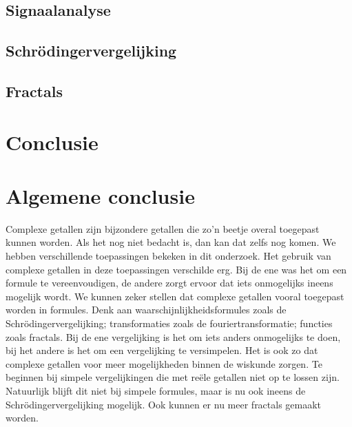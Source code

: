 \documentclass[11pt,fleqn]{book} %
\begin{document}
\subsection*{Signaalanalyse}
\printbibliography[heading=bibempty,keyword=sign]

\subsection*{Schrödingervergelijking}
\printbibliography[heading=bibempty,keyword=schr]

\subsection*{Fractals}
\printbibliography[heading=bibempty,keyword=frac]

\section*{Conclusie}
\printbibliography[heading=bibempty,keyword=conc]

\section*{Algemene conclusie}
Complexe getallen zijn bijzondere getallen die zo'n beetje overal toegepast kunnen worden. Als het nog niet bedacht is, dan kan dat zelfs nog komen. We hebben verschillende toepassingen bekeken in dit onderzoek. Het gebruik van complexe getallen in deze toepassingen verschilde erg. Bij de ene was het om een formule te vereenvoudigen, de andere zorgt ervoor dat iets onmogelijks ineens mogelijk wordt.
We kunnen zeker stellen dat complexe getallen vooral toegepast worden in formules. Denk aan waarschijnlijkheidsformules zoals de Schrödingervergelijking; transformaties zoals de fouriertransformatie; functies zoals fractals. Bij de ene vergelijking is het om iets anders onmogelijks te doen, bij het andere is het om een vergelijking te versimpelen.
Het is ook zo dat complexe getallen voor meer mogelijkheden binnen de wiskunde zorgen. Te beginnen bij simpele vergelijkingen die met reële getallen niet op te lossen zijn. Natuurlijk blijft dit niet bij simpele formules, maar is nu ook ineens de Schrödingervergelijking mogelijk. Ook kunnen er nu meer fractals gemaakt worden.
\end{document}
